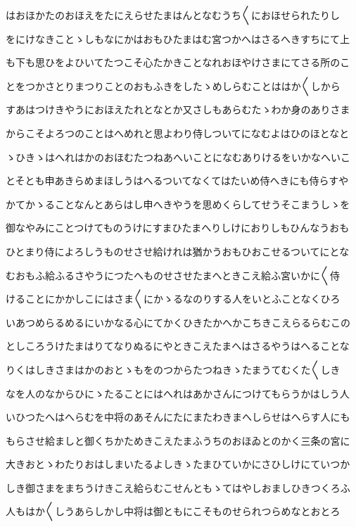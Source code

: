 \documentclass[a4paper,11pt,landscape]{ltjtarticle}
\begin{document}
はおほかたのおほえをたにえらせたまはんとなむうち〱におほせられたりし
\par\medskip
をにけなきことゝしもなにかはおもひたまはむ宮つかへはさるへきすちにて上
\par\medskip
も下も思ひをよひいてたつこそ心たかきことなれおほやけさまにてさる所のこ
\par\medskip
とをつかさとりまつりことのおもふきをしたゝめしらむことははか〱しから
\par\medskip
すあはつけきやうにおほえたれとなとか又さしもあらむたゝわか身のありさま
\par\medskip
からこそよろつのことはへめれと思よわり侍しついてになむよはひのほとなと
\par\medskip
ゝひきゝはへれはかのおほむたつねあへいことになむありけるをいかなへいこ
\par\medskip
とそとも申あきらめまほしうはへるついてなくてはたいめ侍へきにも侍らすや
\par\medskip
かてかゝることなんとあらはし申へきやうを思めくらしてせうそこまうしゝを
\par\medskip
御なやみにことつけてものうけにすまひたまへりしけにおりしもひんなうおも
\par\medskip
ひとまり侍によろしうものせさせ給けれは猶かうおもひおこせるついてにとな
\par\medskip
むおもふ給ふるさやうにつたへものせさせたまへときこえ給ふ宮いかに〱侍
\par\medskip
けることにかかしこにはさま〱にかゝるなのりする人をいとふことなくひろ
\par\medskip
いあつめらるめるにいかなる心にてかくひきたかへかこちきこえらるらむこの
\par\medskip
としころうけたまはりてなりぬるにやときこえたまへはさるやうはへることな
\par\medskip
りくはしきさまはかのおとゝもをのつからたつねきゝたまうてむくた〱しき
\par\medskip
なを人のなからひにゝたることにはへれはあかさんにつけてもらうかはしう人
\par\medskip
いひつたへはへらむを中将のあそんにたにまたわきまへしらせはへらす人にも
\par\medskip
もらさせ給ましと御くちかためきこえたまふうちのおほゐとのかく三条の宮に
\par\medskip
大きおとゝわたりおはしまいたるよしきゝたまひていかにさひしけにていつか
\par\medskip
しき御さまをまちうけきこえ給らむこせんともゝてはやしおましひきつくろふ
\par\medskip
人もはか〱しうあらしかし中将は御ともにこそものせられつらめなとおとろ
\end{document}
